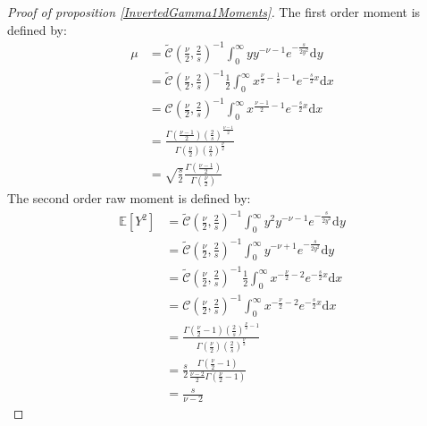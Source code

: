 \documentclass{amsart}
\theoremstyle{plain}
\theoremstyle{remark}
\numberwithin{equation}{section}
\begin{document}
\begin{proof}[Proof of proposition \ref{InvertedGamma1Moments}]
  The first order moment is defined by:
  \[
    \begin{split}
      \mu &= \widetilde{\mathcal C}\left(\frac{\nu}{2}, \frac{2}{s}\right)^{-1} \int_0^{\infty}yy^{-\nu-1}e^{-\frac{s}{2y^2}}\mathrm dy\\
      &= \widetilde{\mathcal C}\left(\frac{\nu}{2}, \frac{2}{s}\right)^{-1}\frac{1}{2} \int_0^{\infty} x^{\frac{\nu}{2}-\frac{1}{2}-1}e^{-\frac{s}{2}x}\mathrm d x\\
      &= \mathcal C\left(\frac{\nu}{2}, \frac{2}{s}\right)^{-1} \int_0^{\infty} x^{\frac{\nu-1}{2}-1}e^{-\frac{s}{2}x}\mathrm d x\\
      &= \frac{\Gamma(\frac{\nu-1}{2})\left(\frac{2}{s}\right)^{\frac{\nu-1}{2}}}{\Gamma(\frac{\nu}{2})\left(\frac{2}{s}\right)^{\frac{\nu}{2}}}\\
      &= \sqrt{\frac{s}{2}}\frac{\Gamma(\frac{\nu-1}{2})}{\Gamma(\frac{\nu}{2})}
    \end{split}
  \]
  The second order raw moment is defined by:
  \[
    \begin{split}
      \mathbb E \left[Y^2\right] &= \widetilde{\mathcal C}\left(\frac{\nu}{2}, \frac{2}{s}\right)^{-1} \int_0^{\infty}y^2y^{-\nu-1}e^{-\frac{s}{2y^2}}\mathrm dy\\
      &= \widetilde{\mathcal C}\left(\frac{\nu}{2}, \frac{2}{s}\right)^{-1} \int_0^{\infty}y^{-\nu+1}e^{-\frac{s}{2y^2}}\mathrm dy\\
      &= \widetilde{\mathcal C}\left(\frac{\nu}{2}, \frac{2}{s}\right)^{-1}\frac{1}{2} \int_0^{\infty}x^{-\frac{\nu}{2}-2}e^{-\frac{s}{2}x}\mathrm dx\\
      &= \mathcal C\left(\frac{\nu}{2}, \frac{2}{s}\right)^{-1} \int_0^{\infty}x^{-\frac{\nu}{2}-2}e^{-\frac{s}{2}x}\mathrm dx\\
      &= \frac{\Gamma\left(\frac{\nu}{2}-1\right)\left(\frac{2}{s}\right)^{\frac{\nu}{2}-1}}{\Gamma\left(\frac{\nu}{2}\right)\left(\frac{2}{s}\right)^{\frac{\nu}{2}}}\\
      &= \frac{s}{2} \frac{\Gamma\left(\frac{\nu}{2}-1\right)} {\frac{\nu-2}{2}\Gamma\left(\frac{\nu}{2}-1\right)}\\
      &= \frac{s}{\nu-2}
    \end{split}
  \]
\end{proof}
\end{document}
